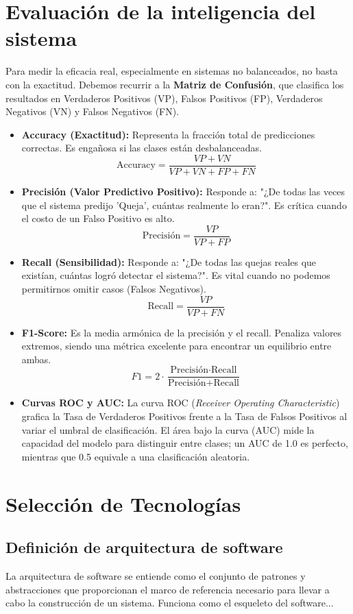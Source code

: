 \section{Evaluación de la inteligencia del sistema}
Para medir la eficacia real, especialmente en sistemas no balanceados, no basta con la exactitud. Debemos recurrir a la \textbf{Matriz de Confusión}, que clasifica los resultados en Verdaderos Positivos (VP), Falsos Positivos (FP), Verdaderos Negativos (VN) y Falsos Negativos (FN).
\begin{itemize}
\item \textbf{Accuracy (Exactitud):} Representa la fracción total de predicciones correctas. Es engañosa si las clases están desbalanceadas.
$$\text{Accuracy} = \frac{VP + VN}{VP + VN + FP + FN}$$
\item \textbf{Precisión (Valor Predictivo Positivo):} Responde a: "¿De todas las veces que el sistema predijo 'Queja', cuántas realmente lo eran?". Es crítica cuando el costo de un Falso Positivo es alto.
$$\text{Precisión} = \frac{VP}{VP + FP}$$
\item \textbf{Recall (Sensibilidad):} Responde a: "¿De todas las quejas reales que existían, cuántas logró detectar el sistema?". Es vital cuando no podemos permitirnos omitir casos (Falsos Negativos).
$$\text{Recall} = \frac{VP}{VP + FN}$$
\item \textbf{F1-Score:} Es la media armónica de la precisión y el recall. Penaliza valores extremos, siendo una métrica excelente para encontrar un equilibrio entre ambas.
$$F1 = 2 \cdot \frac{\text{Precisión} \cdot \text{Recall}}{\text{Precisión} + \text{Recall}}$$
\item \textbf{Curvas ROC y AUC:} La curva ROC (\textit{Receiver Operating Characteristic}) grafica la Tasa de Verdaderos Positivos frente a la Tasa de Falsos Positivos al variar el umbral de clasificación. El área bajo la curva (AUC) mide la capacidad del modelo para distinguir entre clases; un AUC de 1.0 es perfecto, mientras que 0.5 equivale a una clasificación aleatoria.
\end{itemize}


\section{Selección de Tecnologías}


\subsection{Definición de arquitectura de software}
La arquitectura de software se entiende como el conjunto de patrones y abstracciones que proporcionan el marco de referencia necesario para llevar a cabo la construcción de un sistema. Funciona como el esqueleto del software...

